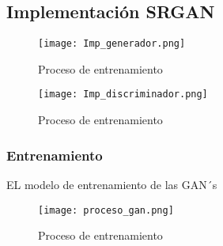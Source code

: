 \subsection{Implementación SRGAN}



\begin{figure}[H]
  \begin{center}
    \texttt{[image: Imp\_generador.png]}
    \caption{Proceso de entrenamiento}
    \label{Alexis4}
  \end{center}
\end{figure}

\begin{figure}[H]
  \begin{center}
    \texttt{[image: Imp\_discriminador.png]}
    \caption{Proceso de entrenamiento}
    \label{Alexis5}
  \end{center}
\end{figure}





\subsubsection{Entrenamiento}

EL modelo de entrenamiento de las GAN´s

\begin{figure}[H]
    \begin{center}
      \texttt{[image: proceso\_gan.png]}
      \caption{Proceso de entrenamiento}
      \label{Alexis6}
    \end{center}
\end{figure}